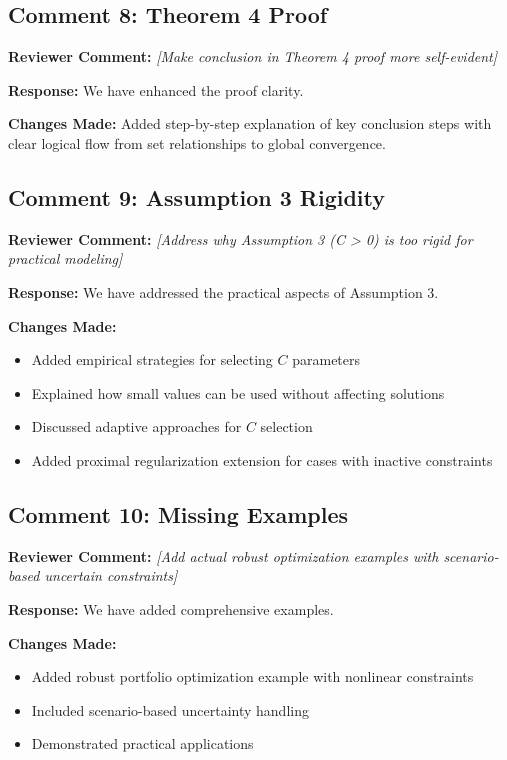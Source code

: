 \documentclass[11pt]{article}
\newcommand{\reviewercomment}[1]{\textbf{Reviewer Comment:} \textit{#1}}
\newcommand{\response}[1]{\textbf{Response:} #1}
\newcommand{\changes}[1]{\textbf{Changes Made:} #1}
\begin{document}
\subsection*{Comment 8: Theorem 4 Proof}

\reviewercomment{[Make conclusion in Theorem 4 proof more self-evident]}

\response{We have enhanced the proof clarity.}

\changes{Added step-by-step explanation of key conclusion steps with clear logical flow from set relationships to global convergence.}

\subsection*{Comment 9: Assumption 3 Rigidity}

\reviewercomment{[Address why Assumption 3 (C > 0) is too rigid for practical modeling]}

\response{We have addressed the practical aspects of Assumption 3.}

\changes{
\begin{itemize}
\item Added empirical strategies for selecting $C$ parameters
\item Explained how small values can be used without affecting solutions
\item Discussed adaptive approaches for $C$ selection
\item Added proximal regularization extension for cases with inactive constraints
\end{itemize}
}

\subsection*{Comment 10: Missing Examples}

\reviewercomment{[Add actual robust optimization examples with scenario-based uncertain constraints]}

\response{We have added comprehensive examples.}

\changes{
\begin{itemize}
\item Added robust portfolio optimization example with nonlinear constraints
\item Included scenario-based uncertainty handling
\item Demonstrated practical applications
\end{itemize}
}
\end{document}
